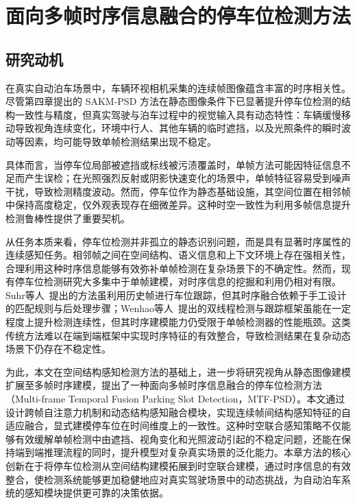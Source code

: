  \setlength{\baselineskip}{20pt}
\chapter{面向多帧时序信息融合的停车位检测方法}
\label{cha:chap4}



\section{研究动机}
在真实自动泊车场景中，车辆环视相机采集的连续帧图像蕴含丰富的时序相关性。尽管第四章提出的 SAKM-PSD 方法在静态图像条件下已显著提升停车位检测的结构一致性与精度，但真实驾驶与泊车过程中的视觉输入具有动态特性：车辆缓慢移动导致视角连续变化，环境中行人、其他车辆的临时遮挡，以及光照条件的瞬时波动等因素，均可能导致单帧检测结果出现不稳定。

具体而言，当停车位局部被遮挡或标线被污渍覆盖时，单帧方法可能因特征信息不足而产生误检；在光照强烈反射或阴影快速变化的场景中，单帧特征容易受到噪声干扰，导致检测精度波动。然而，停车位作为静态基础设施，其空间位置在相邻帧中保持高度稳定，仅外观表现存在细微差异。这种时空一致性为利用多帧信息提升检测鲁棒性提供了重要契机。

从任务本质来看，停车位检测并非孤立的静态识别问题，而是具有显著时序属性的连续感知任务。相邻帧之间在空间结构、语义信息和上下文环境上存在强相关性，合理利用这种时序信息能够有效弥补单帧检测在复杂场景下的不确定性。然而，现有停车位检测研究大多集中于单帧建模，对时序信息的挖掘和利用仍相对有限。Suhr等人~\cite{suhr2018universal}提出的方法虽利用历史帧进行车位跟踪，但其时序融合依赖于手工设计的匹配规则与后处理步骤；Wenhao等人~\cite{zong2018robust}提出的双线程检测与跟踪框架虽能在一定程度上提升检测连续性，但其时序建模能力仍受限于单帧检测器的性能瓶颈。这类传统方法难以在端到端框架中实现时序特征的有效整合，导致检测结果在复杂动态场景下仍存在不稳定性。

为此，本文在空间结构感知检测方法的基础上，进一步将研究视角从静态图像建模扩展至多帧时序建模，提出了一种面向多帧时序信息融合的停车位检测方法（Multi-frame Temporal Fusion Parking Slot Detection，MTF-PSD）。本文通过设计跨帧自注意力机制和动态结构感知融合模块，实现连续帧间结构感知特征的自适应融合，显式建模停车位在时间维度上的一致性。这种时空联合感知策略不仅能够有效缓解单帧检测中由遮挡、视角变化和光照波动引起的不稳定问题，还能在保持端到端推理流程的同时，提升模型对复杂真实场景的泛化能力。本章方法的核心创新在于将停车位检测从空间结构建模拓展到时空联合建模，通过时序信息的有效整合，使检测系统能够更加稳健地应对真实驾驶场景中的动态挑战，为自动泊车系统的感知模块提供更可靠的决策依据。




